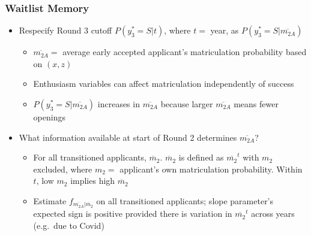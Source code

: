 \documentclass[12pt, aspectratio=169]{beamer}
\begin{document}
\begin{frame}[label=wme]
\frametitle{Waitlist Memory}
\begin{itemize}
\item Respecify Round 3 cutoff $P(y_3^*=S|t)$, where $t=$ year, as $P(y_3^*=S|\overline{m_{2A}})$
\vspace{5pt}
\begin{itemize}
\item $\overline{m_{2A}}=$ average early accepted applicant's matriculation probability based on $(x,z)$
\vspace{5pt}
\item Enthusiasm variables can affect matriculation independently of success
\vspace{5pt}
\item $P(y_3^*=S|\overline{m_{2A}})$ increases in $\overline{m_{2A}}$ because larger $\overline{m_{2A}}$ means fewer openings
\vspace{10pt}
\end{itemize}
\item What information available at start of Round 2 determines $\overline{m_{2A}}$?
\vspace{5pt}
\begin{itemize}
\item For all transitioned applicants, $\ddot{m_2}$. $\ddot{m_2}$ is defined as $\overline{m_2}^t$ with $m_2$ excluded, where $m_2=$ applicant's own matriculation probability. Within $t$, low $m_2$ implies high $\ddot{m_2}$
\vspace{5pt}
\item Estimate $f_{{\overline{m_{2A}}|\ddot{m_2}}}$ on all transitioned applicants; slope parameter's expected sign is positive provided there is variation in $\overline{m_2}^t$ across years (e.g.\ due to Covid)
\vspace{10pt}
\end{itemize}
\end{itemize}
\hyperlink{wm1}{} \hyperlink{wn}{}
\end{frame}
\end{document}
